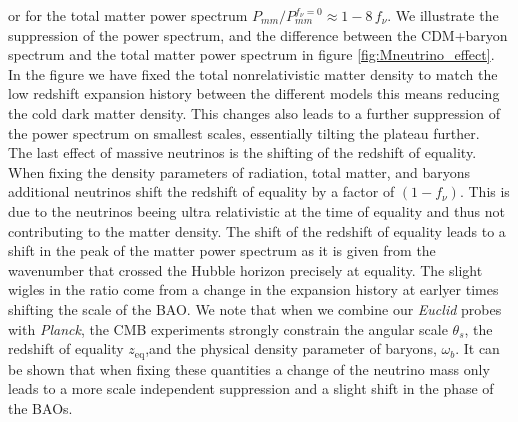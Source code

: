 \documentclass[oneside]{book}
\newcommand*{\Euclid}{\textit{Euclid}\xspace}
\newcommand*{\Planck}{\textit{Planck}\xspace}
\begin{document}
or for the total matter power spectrum $P_{mm}/P_{mm}^{f_\nu=0} \approx 1- 8\,f_\nu$. We illustrate the suppression of the power spectrum, and the difference between the CDM+baryon spectrum and the total matter power spectrum in figure \ref{fig:Mneutrino_effect}. In the figure we have fixed the total nonrelativistic matter density to match the low redshift expansion history between the different models this means reducing the cold dark matter density. This changes also leads to a further suppression of the power spectrum on smallest scales, essentially tilting the plateau further.\\
The last effect of massive neutrinos is the shifting of the redshift of equality. When fixing the density parameters of radiation, total matter, and baryons additional neutrinos shift the redshift of equality by a factor of $(1-f_\nu)$. This is due to the neutrinos beeing ultra relativistic at the time of equality and thus not contributing to the matter density. The shift of the redshift of equality leads to a shift in the peak of the matter power spectrum as it is given from the wavenumber that crossed the Hubble horizon precisely at equality. The slight wigles in the ratio come from a change in the expansion history at earlyer times shifting the scale of the BAO. We note that when we combine our \Euclid probes with \Planck, the CMB experiments strongly constrain the angular scale $\theta_s$, the redshift of equality $z_\mathrm{eq}$,and the physical density parameter of baryons, $\omega_b$. It can be shown that when fixing these quantities a change of the neutrino mass only leads to a more scale independent suppression and a slight shift in the phase of the BAOs.
\end{document}
